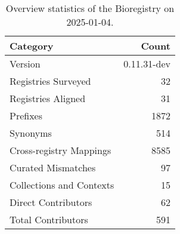 \begin{table}
\caption{Overview statistics of the Bioregistry on 2025-01-04.}
\label{tab:bioregistry-summary}
\begin{tabular}{lr}
\toprule
Category & Count \\
\midrule
Version & 0.11.31-dev \\
Registries Surveyed & 32 \\
Registries Aligned & 31 \\
Prefixes & 1872 \\
Synonyms & 514 \\
Cross-registry Mappings & 8585 \\
Curated Mismatches & 97 \\
Collections and Contexts & 15 \\
Direct Contributors & 62 \\
Total Contributors & 591 \\
\bottomrule
\end{tabular}
\end{table}
